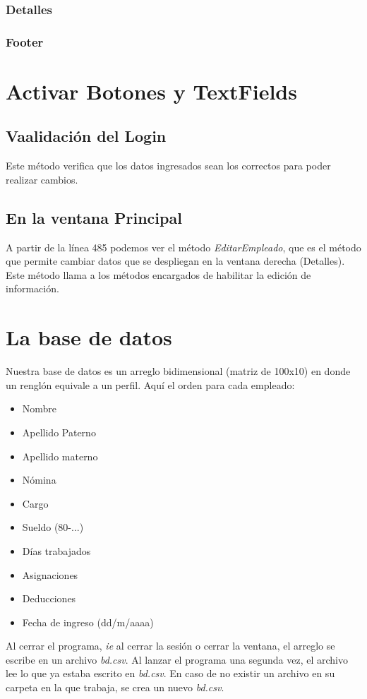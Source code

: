 \documentclass[12pt]{article}
\begin{document}
\subsubsection{Detalles}


\subsubsection{Footer}



\section{Activar Botones y TextFields}

\subsection{Vaalidaci\'on del Login}
{Este m\'etodo verifica que los datos ingresados sean los correctos para poder realizar cambios.}


\subsection{En la ventana Principal}
{A partir de la l\'inea 485 podemos ver el m\'etodo \textit{EditarEmpleado}, que es el m\'etodo que permite cambiar datos que se despliegan en la ventana derecha (Detalles).}\\
{Este m\'etodo llama a los m\'etodos encargados de habilitar la edici\'on de informaci\'on.}

\section{La base de datos}
{Nuestra base de datos es un arreglo bidimensional (matriz de 100x10) en donde un rengl\'on equivale a un perfil. Aqu\'i el orden para cada empleado:}
\begin{itemize}
\item Nombre
\item Apellido Paterno
\item Apellido materno
\item N\'omina
\item Cargo
\item Sueldo (80-...)
\item D\'ias trabajados
\item Asignaciones
\item Deducciones
\item Fecha de ingreso (dd/m/aaaa)
\end{itemize}
{Al cerrar el programa, \textit{ie} al cerrar la sesi\'on o cerrar la ventana, el arreglo se escribe en un archivo \textit{bd.csv}. Al lanzar el programa una segunda vez, el archivo lee lo que ya estaba escrito en \textit{bd.csv}. En caso de no existir un archivo en su carpeta en la que trabaja, se crea un nuevo \textit{bd.csv}.}
\end{document}
